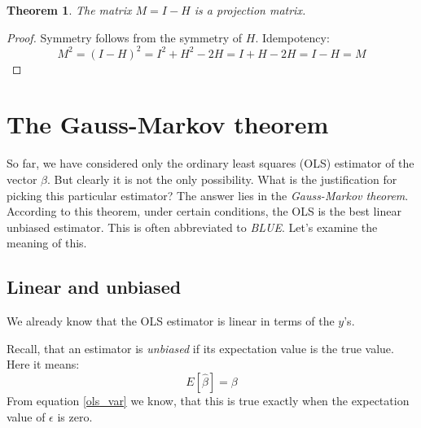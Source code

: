 \documentclass[12pt, a4paper]{article}
\newtheorem{theorem}{Theorem}
\begin{document}
\begin{theorem}
The matrix $M=I-H$ is a projection matrix.
\end{theorem}
\begin{proof}
Symmetry follows from the symmetry of $H$. Idempotency:
\begin{equation}
M^2=(I-H)^2=I^2+H^2-2H=I+H-2H=I-H=M
\end{equation}
\end{proof}

\section{The Gauss-Markov theorem}
So far, we have considered only the ordinary least squares (OLS) estimator of the vector $\beta$. But clearly it is not the only possibility. What is the justification for picking this particular estimator? The answer lies in the \textit{Gauss-Markov theorem}. According to this theorem, under certain conditions, the OLS is the best linear unbiased estimator. This is often abbreviated to \textit{BLUE}. Let's examine the meaning of this.

\subsection{Linear and unbiased}
We already know that the OLS estimator is linear in terms of the $y$'s.

Recall, that an estimator is \textit{unbiased} if its expectation value is the true value. Here it means:
\begin{equation}
E[\hat{\beta}]=\beta
\end{equation}
From equation \ref{ols_var} we know, that this is true exactly when the expectation value of $\epsilon$ is zero.
\end{document}
